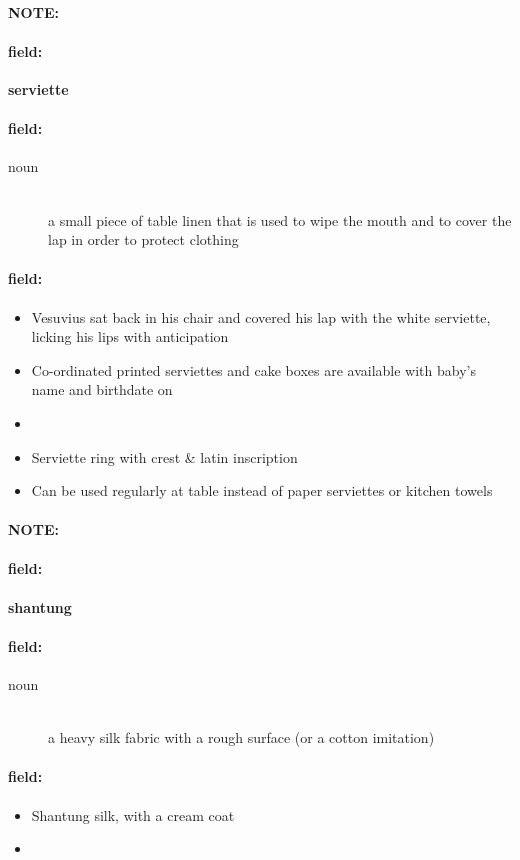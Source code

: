 \documentclass[12pt]{article}
\newenvironment{note}{\paragraph{NOTE:}}{}
\newenvironment{field}{\paragraph{field:}}{}
\begin{document}
\begin{note}
\begin{field}
\textbf{\large serviette}
\end{field}


\begin{field}
\begin{description}
\item[noun] \hfill \\ 
a small piece of table linen that is used to wipe the mouth and to cover the lap in order to protect clothing

\end{description}
\end{field}

\begin{field}
\begin{itemize}
\item Vesuvius sat back in his chair and covered his lap with the white serviette, licking his lips with anticipation
\item Co-ordinated printed serviettes and cake boxes are available with baby's name and birthdate on
\item 
\item Serviette ring with crest & latin inscription
\item Can be used regularly at table instead of paper serviettes or kitchen towels
\end{itemize}
\end{field}
\end{note}
\begin{note}
\begin{field}
\textbf{\large shantung}
\end{field}


\begin{field}
\begin{description}
\item[noun] \hfill \\ 
a heavy silk fabric with a rough surface (or a cotton imitation)

\end{description}
\end{field}

\begin{field}
\begin{itemize}
\item Shantung silk, with a cream coat
\item 
\end{itemize}
\end{field}
\end{note}
\end{document}
